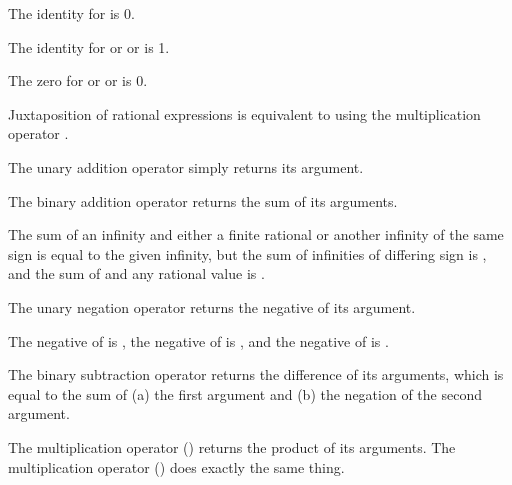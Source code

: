 The identity for \EXP{+} is 0.

The identity for  or \EXP{\cdot} or \EXP{\times} is 1.

The zero for  or \EXP{\cdot} or \EXP{\times} is 0.




Juxtaposition of rational expressions is equivalent to using the multiplication operator \EXP{\cdot}.



The unary addition operator \EXP{+} simply returns its argument.



The binary addition operator \EXP{+} returns the sum of its arguments.

The sum of an infinity
and either a finite rational or another infinity of the same sign is equal to the given infinity,
but the sum of infinities of differing sign is ,
and the sum of  and any rational value is .



The unary negation operator \EXP{-} returns the negative of its argument.

The negative of
\EXP{+\infty} is \EXP{-\infty}, the negative of \EXP{-\infty} is \EXP{+\infty},
and the negative of  is .



The binary subtraction operator \EXP{-} returns the difference of its arguments,
which is equal to the sum of (a) the first argument and (b) the negation of the second argument.



The multiplication operator \EXP{\cdot} () returns the product of its arguments.
The multiplication operator \EXP{\times} () does exactly the same thing.

